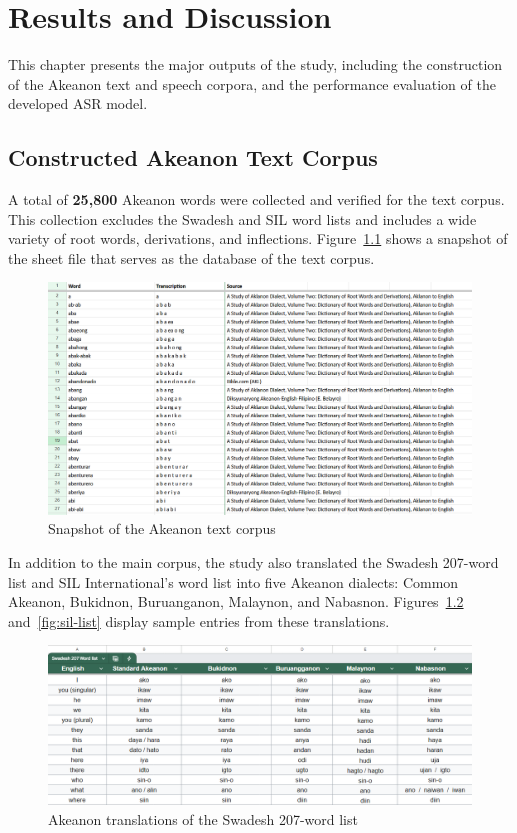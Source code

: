 \chapter{Results and Discussion}

This chapter presents the major outputs of the study, including the construction of the Akeanon text and speech corpora, and the performance evaluation of the developed ASR model.

\section{Constructed Akeanon Text Corpus}
A total of \textbf{25,800} Akeanon words were collected and verified for the text corpus. This collection excludes the Swadesh and SIL word lists and includes a wide variety of root words, derivations, and inflections. Figure~\ref{fig:text-corpus} shows a snapshot of the sheet file that serves as the database of the text corpus.

\begin{figure}[H]
    \centering
    \includegraphics[width=\textwidth]{./figures/text-corpus.png}
    \caption{Snapshot of the Akeanon text corpus}
    \label{fig:text-corpus}
\end{figure}

In addition to the main corpus, the study also translated the Swadesh 207-word list and SIL International's word list into five Akeanon dialects: Common Akeanon, Bukidnon, Buruanganon, Malaynon, and Nabasnon. Figures~\ref{fig:swadesh-list} and~\ref{fig:sil-list} display sample entries from these translations.

\begin{figure}[H]
    \centering
    \includegraphics[width=\textwidth]{./figures/swadesh.png}
    \caption{Akeanon translations of the Swadesh 207-word list}
    \label{fig:swadesh-list}
\end{figure}

